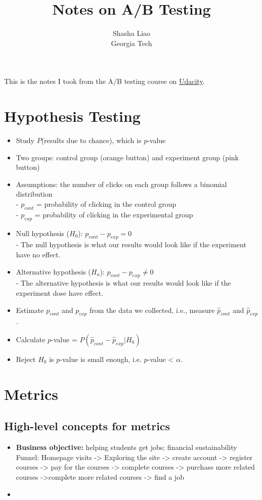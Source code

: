 \documentclass[twoside,12pt]{article}
\begin{document}
\title{Notes on A/B Testing}
\author {Shasha Liao \\ Georgia Tech}
\maketitle
This is the notes I took from the A/B testing course on \href{https://classroom.udacity.com/courses/ud257}{Udacity}.
\section{Hypothesis Testing}
\begin{itemize}
\item Study $P$(results due to chance), which is $p$-value
\item Two groups: control group (orange button) and experiment group (pink button)
\item Assumptions: the number of clicks on each group follows a binomial distribution \\
- $p_{cont}$ = probability of clicking in the control group \\
- $p_{exp}$ = probability of clicking in the experimental group 
\item Null hypothesis ($H_0$): $p_{cont} - p_{exp} = 0$ \\
- The null hypothesis is what our results would look like if the experiment have no effect.

\item Alternative hypothesis ($H_a$): $p_{cont} - p_{exp} \neq 0$\\
- The alternative hypothesis is what our results would look like if the experiment dose have effect.
\item Estimate $p_{cont}$ and $p_{exp}$ from the data we collected, i.e., measure $\hat{p}_{cont}$ and $\hat{p}_{exp}$.
\item Calculate $p$-value = $P(\hat{p}_{cont} - \hat{p}_{exp} | H_0 )$
\item Reject $H_0$ is $p$-value is small enough, i.e. $p$-value < $\alpha$.
\end{itemize}
\section{Metrics}
\subsection{High-level concepts for metrics}
\begin{itemize}
\item \textbf{Business objective:} helping students get jobs; financial sustainability 
Funnel: Homepage visits -> Exploring the site -> create account -> register courses -> pay for the courses -> complete courses -> purchase more related courses ->complete more related courses -> find a job
\item 
\end{itemize}
\end{document}
